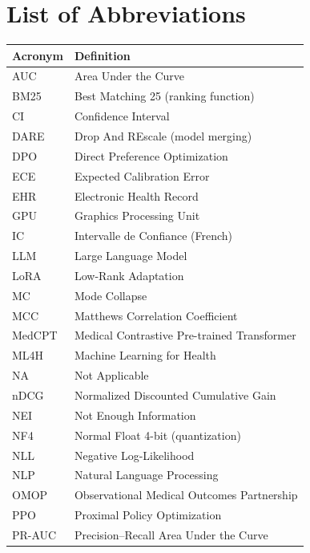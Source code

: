 
\chapter*{List of Abbreviations}

\begin{tabular}{@{}p{3cm}l@{}}
\toprule
\textbf{Acronym} & \textbf{Definition} \\
\midrule
AUC   & Area Under the Curve \\
BM25  & Best Matching 25 (ranking function) \\
CI    & Confidence Interval \\
DARE  & Drop And REscale (model merging) \\
DPO   & Direct Preference Optimization \\
ECE   & Expected Calibration Error \\
EHR   & Electronic Health Record \\
GPU   & Graphics Processing Unit \\
IC    & Intervalle de Confiance (French) \\
LLM   & Large Language Model \\
LoRA  & Low-Rank Adaptation \\
MC    & Mode Collapse \\
MCC   & Matthews Correlation Coefficient \\
MedCPT & Medical Contrastive Pre-trained Transformer \\
ML4H  & Machine Learning for Health \\
NA    & Not Applicable \\
nDCG  & Normalized Discounted Cumulative Gain \\
NEI   & Not Enough Information \\
NF4   & Normal Float 4-bit (quantization) \\
NLL   & Negative Log-Likelihood \\
NLP   & Natural Language Processing \\
OMOP  & Observational Medical Outcomes Partnership \\
PPO   & Proximal Policy Optimization \\
PR-AUC & Precision--Recall Area Under the Curve \\

\end{tabular}
